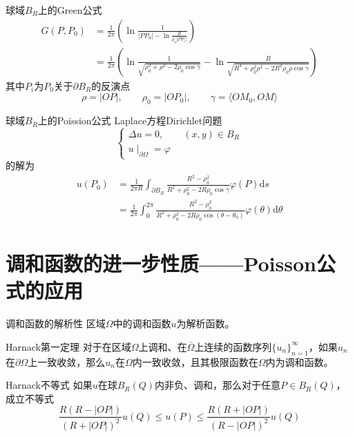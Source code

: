 \documentclass[lang = cn, scheme = chinese, thmcnt = section]{elegantbook}
\newcommand{\dd}{\mathrm{d}}           %
\begin{document}
\begin{theorem}{球域$B_R$上的Green公式}
	\begin{align*}
		G(P,P_0)
		& = \frac{1}{2\pi}\left(\ln\frac{1}{|PP_0|-\ln\frac{R}{\rho_0|PP_i|}}\right)\\
		& = \frac{1}{2\pi}\left(
		\ln\frac{1}{\sqrt{\rho_0^2+\rho^2-2\rho_0\cos\gamma}}-\ln\frac{R}{\sqrt{R^4+\rho_0^2\rho^2-2R^2\rho_0\rho\cos\gamma}}
		\right)
	\end{align*}
	其中$P_i$为$P_0$关于$\partial B_R$的反演点%
	$$
	\rho=|OP|,\qquad
	\rho_0=|OP_0|,\qquad
	\gamma=\langle OM_0,OM \rangle
	$$
\end{theorem}

\begin{theorem}{球域$B_R$上的Poission公式}
	Laplace方程Dirichlet问题%
	$$
	\begin{cases}
		\Delta u=0,\qquad (x,y)\in B_R\\
		u\mid_{\partial\Omega}=\varphi
	\end{cases}
	$$
	的解为
	\begin{align*}
		u(P_0)
		& = \frac{1}{2\pi R}\int_{\partial B_R}\frac{R^2-\rho_0^2}{R^2+\rho_0^2-2R\rho_0\cos\gamma}\varphi(P)\dd s\\
		& = \frac{1}{2\pi}\int_{0}^{2\pi}\frac{R^2-\rho_0^2}{R^2+\rho_0^2-2R\rho_0\cos(\theta-\theta_0)}\varphi(\theta)\dd\theta
	\end{align*}
\end{theorem}

\section{调和函数的进一步性质——Poisson公式的应用}

\begin{theorem}{调和函数的解析性}
	区域$\Omega$中的调和函数$u$为解析函数。
\end{theorem}

\begin{theorem}{Harnack第一定理}
	对于在区域$\Omega$上调和、在$\overline{\Omega}$上连续的函数序列$\{ u_n \}_{n=1}^{\infty}$，如果$u_n$在$\partial\Omega$上一致收敛，那么$u_n$在$\Omega$内一致收敛，且其极限函数在$\Omega$内为调和函数。
\end{theorem}

\begin{theorem}{Harnack不等式}
	如果$u$在球$B_R(Q)$内非负、调和，那么对于任意$P\in B_R(Q)$，成立不等式%
	$$
	\frac{R(R-|OP|)}{(R+|OP|)^2}u(Q)
	\le u(P)
	\le \frac{R(R+|OP|)}{(R-|OP|)^2}u(Q)
	$$
\end{theorem}
\end{document}
